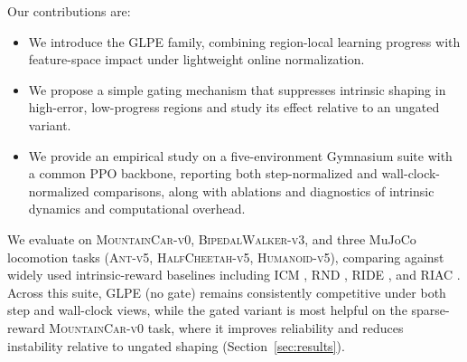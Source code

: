 Our contributions are:
\begin{itemize}
    \item We introduce the GLPE family, combining region-local learning progress with feature-space impact under lightweight online normalization.
    \item We propose a simple gating mechanism that suppresses intrinsic shaping in high-error, low-progress regions and study its effect relative to an ungated variant.
    \item We provide an empirical study on a five-environment Gymnasium suite with a common PPO backbone, reporting both step-normalized and wall-clock-normalized comparisons, along with ablations and diagnostics of intrinsic dynamics and computational overhead.
\end{itemize}

We evaluate on \textsc{MountainCar-v0}, \textsc{BipedalWalker-v3}, and three MuJoCo locomotion tasks (\textsc{Ant-v5}, \textsc{HalfCheetah-v5}, \textsc{Humanoid-v5}), comparing against widely used intrinsic-reward baselines including ICM \cite{pathak-2017}, RND \cite{burda-2018B}, RIDE \cite{raileanu-2020}, and RIAC \cite{baranes-2009}.
Across this suite, GLPE (no gate) remains consistently competitive under both step and wall-clock views, while the gated variant is most helpful on the sparse-reward \textsc{MountainCar-v0} task, where it improves reliability and reduces instability relative to ungated shaping (Section~\ref{sec:results}).
